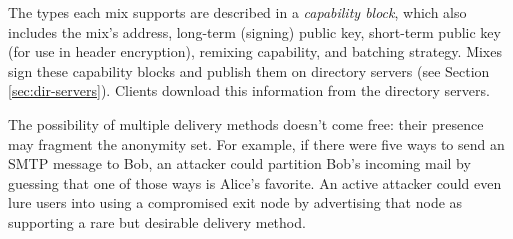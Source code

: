 \documentclass[11pt]{IEEEtran}
\begin{document}
%
%

The types each mix supports are described in a \emph{capability block},
which also includes the mix's address, long-term (signing) public key,
short-term public key (for use in header encryption), remixing capability,
and batching strategy. Mixes sign these capability blocks
and publish them on directory servers (see Section \ref{sec:dir-servers}).
Clients download this information from the directory servers.

%

The possibility of multiple delivery methods doesn't come free: their
presence may fragment the anonymity set.  For example, if there were five
ways to send an SMTP message to Bob, an attacker could partition Bob's
incoming mail by guessing that one of those ways is Alice's favorite.
An active attacker could even lure users into using a compromised
exit node by advertising that node as supporting a
rare but desirable delivery method.
\end{document}
